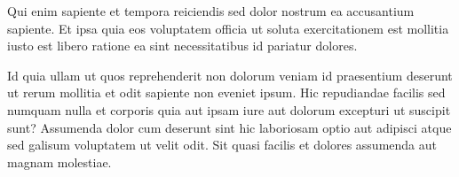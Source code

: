 Qui enim sapiente et tempora reiciendis sed dolor nostrum ea accusantium sapiente. Et ipsa quia eos voluptatem officia ut soluta exercitationem est mollitia iusto est libero ratione ea sint necessitatibus id pariatur dolores.

Id quia ullam ut quos reprehenderit non dolorum veniam id praesentium deserunt ut rerum mollitia et odit sapiente non eveniet ipsum. Hic repudiandae facilis sed numquam nulla et corporis quia aut ipsam iure aut dolorum excepturi ut suscipit sunt? Assumenda dolor cum deserunt sint hic laboriosam optio aut adipisci atque sed galisum voluptatem ut velit odit. Sit quasi facilis et dolores assumenda aut magnam molestiae.